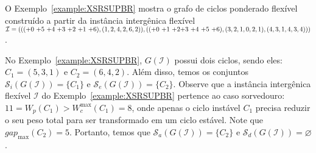 O Exemplo~\ref{example:XSRSUPBR} mostra o grafo de ciclos ponderado flexível construído a partir da instância intergênica flexível $\mathcal{I} = ((({+0}~{+5}~{+4}~{+3}~{+2}~{+1}~{+6}),(1,2,4,2,6,2)),(({+0}~{+1}~{+2}\break{+3}~{+4}~{+5}~{+6}),(3,2,1,0,2,1),(4,3,1,4,3,4)))$.



No Exemplo~\ref{example:XSRSUPBR}, $G(\mathcal{I})$ possui dois ciclos, sendo eles: $C_1 = (5,3,1)$ e $C_2 = (6,4,2)$. Além disso, temos os conjuntos $\mathcal{S}_i(G(\mathcal{I})) = \{C_1\}$ e $\mathcal{S}_e(G(\mathcal{I})) = \{C_2\}$. Observe que a instância intergênica flexível $\mathcal{I}$ do Exemplo~\ref{example:XSRSUPBR} pertence ao caso sorvedouro: $11 = W_p(C_1) > W^{\max}_c(C_1) = 8$, onde apenas o ciclo instável $C_1$ precisa reduzir o seu peso total para ser transformado em um ciclo estável. Note que $gap_{\max}(C_2) = 5$. Portanto, temos que $\mathcal{S}_a(G(\mathcal{I})) = \{C_2\}$ e $\mathcal{S}_d(G(\mathcal{I})) = \varnothing$.